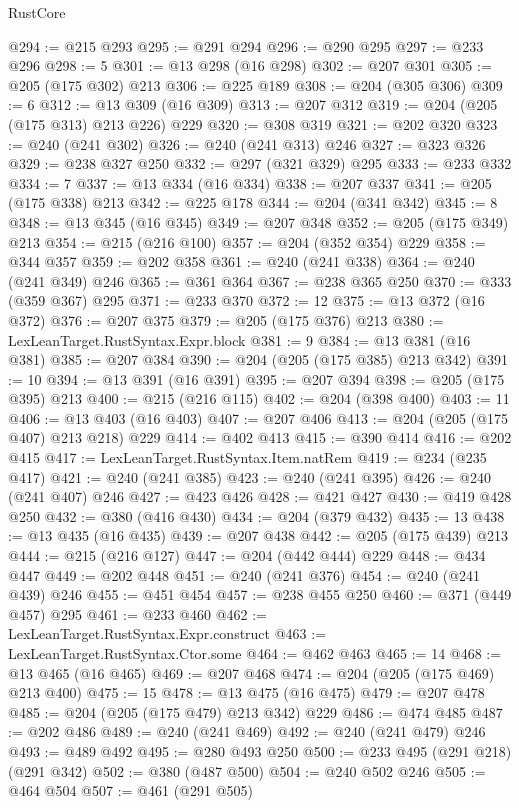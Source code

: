 \begin{lexlean}{RustCore}
\begin{coremodule}
@294 := @215 @293
@295 := @291 @294
@296 := @290 @295
@297 := @233 @296
@298 := 5
@301 := @13 @298 (@16 @298)
@302 := @207 @301
@305 := @205 (@175 @302) @213
@306 := @225 @189
@308 := @204 (@305 @306)
@309 := 6
@312 := @13 @309 (@16 @309)
@313 := @207 @312
@319 := @204 (@205 (@175 @313) @213 @226) @229
@320 := @308 @319
@321 := @202 @320
@323 := @240 (@241 @302)
@326 := @240 (@241 @313) @246
@327 := @323 @326
@329 := @238 @327 @250
@332 := @297 (@321 @329) @295
@333 := @233 @332
@334 := 7
@337 := @13 @334 (@16 @334)
@338 := @207 @337
@341 := @205 (@175 @338) @213
@342 := @225 @178
@344 := @204 (@341 @342)
@345 := 8
@348 := @13 @345 (@16 @345)
@349 := @207 @348
@352 := @205 (@175 @349) @213
@354 := @215 (@216 @100)
@357 := @204 (@352 @354) @229
@358 := @344 @357
@359 := @202 @358
@361 := @240 (@241 @338)
@364 := @240 (@241 @349) @246
@365 := @361 @364
@367 := @238 @365 @250
@370 := @333 (@359 @367) @295
@371 := @233 @370
@372 := 12
@375 := @13 @372 (@16 @372)
@376 := @207 @375
@379 := @205 (@175 @376) @213
@380 := LexLeanTarget.RustSyntax.Expr.block
@381 := 9
@384 := @13 @381 (@16 @381)
@385 := @207 @384
@390 := @204 (@205 (@175 @385) @213 @342)
@391 := 10
@394 := @13 @391 (@16 @391)
@395 := @207 @394
@398 := @205 (@175 @395) @213
@400 := @215 (@216 @115)
@402 := @204 (@398 @400)
@403 := 11
@406 := @13 @403 (@16 @403)
@407 := @207 @406
@413 := @204 (@205 (@175 @407) @213 @218) @229
@414 := @402 @413
@415 := @390 @414
@416 := @202 @415
@417 := LexLeanTarget.RustSyntax.Item.natRem
@419 := @234 (@235 @417)
@421 := @240 (@241 @385)
@423 := @240 (@241 @395)
@426 := @240 (@241 @407) @246
@427 := @423 @426
@428 := @421 @427
@430 := @419 @428 @250
@432 := @380 (@416 @430)
@434 := @204 (@379 @432)
@435 := 13
@438 := @13 @435 (@16 @435)
@439 := @207 @438
@442 := @205 (@175 @439) @213
@444 := @215 (@216 @127)
@447 := @204 (@442 @444) @229
@448 := @434 @447
@449 := @202 @448
@451 := @240 (@241 @376)
@454 := @240 (@241 @439) @246
@455 := @451 @454
@457 := @238 @455 @250
@460 := @371 (@449 @457) @295
@461 := @233 @460
@462 := LexLeanTarget.RustSyntax.Expr.construct
@463 := LexLeanTarget.RustSyntax.Ctor.some
@464 := @462 @463
@465 := 14
@468 := @13 @465 (@16 @465)
@469 := @207 @468
@474 := @204 (@205 (@175 @469) @213 @400)
@475 := 15
@478 := @13 @475 (@16 @475)
@479 := @207 @478
@485 := @204 (@205 (@175 @479) @213 @342) @229
@486 := @474 @485
@487 := @202 @486
@489 := @240 (@241 @469)
@492 := @240 (@241 @479) @246
@493 := @489 @492
@495 := @280 @493 @250
@500 := @233 @495 (@291 @218) (@291 @342)
@502 := @380 (@487 @500)
@504 := @240 @502 @246
@505 := @464 @504
@507 := @461 (@291 @505)

\end{coremodule}
\end{lexlean}
